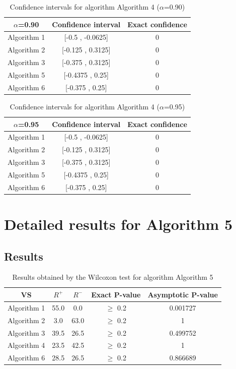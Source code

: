 \documentclass[a4paper,10pt]{article}
\begin{document}
\begin{table}[!htp]
\centering\small
\begin{tabular}{
|c|c|c|}
\hline
 $\alpha$=0.90 & Confidence interval & Exact confidence \\ \hline 
Algorithm 1 & [-0.5 , -0.0625] & 0\\ \hline 
Algorithm 2 & [-0.125 , 0.3125] & 0\\ \hline 
Algorithm 3 & [-0.375 , 0.3125] & 0\\ \hline 
Algorithm 5 & [-0.4375 , 0.25] & 0\\ \hline 
Algorithm 6 & [-0.375 , 0.25] & 0\\ \hline 

\end{tabular}
\caption{Confidence intervals for algorithm Algorithm 4 ($\alpha$=0.90)}
\end{table}
\begin{table}[!htp]
\centering\small
\begin{tabular}{
|c|c|c|}
\hline
 $\alpha$=0.95 & Confidence interval & Exact confidence \\ \hline 
Algorithm 1 & [-0.5 , -0.0625] & 0\\ \hline 
Algorithm 2 & [-0.125 , 0.3125] & 0\\ \hline 
Algorithm 3 & [-0.375 , 0.3125] & 0\\ \hline 
Algorithm 5 & [-0.4375 , 0.25] & 0\\ \hline 
Algorithm 6 & [-0.375 , 0.25] & 0\\ \hline 

\end{tabular}
\caption{Confidence intervals for algorithm Algorithm 4 ($\alpha$=0.95)}
\end{table}

 \clearpage 


\section{Detailed results for Algorithm 5}


\subsection{Results}

\begin{table}[!htp]
\centering\small
\begin{tabular}{
|c|c|c|c|c|}
\hline
 VS & $R^{+}$ & $R^{-}$ & Exact P-value & Asymptotic P-value \\ \hline 
Algorithm 1 & 55.0 & 0.0 & $\geq$ 0.2 & 0.001727\\ \hline 
Algorithm 2 & 3.0 & 63.0 & $\geq$ 0.2 & 1\\ \hline 
Algorithm 3 & 39.5 & 26.5 & $\geq$ 0.2 & 0.499752\\ \hline 
Algorithm 4 & 23.5 & 42.5 & $\geq$ 0.2 & 1\\ \hline 
Algorithm 6 & 28.5 & 26.5 & $\geq$ 0.2 & 0.866689\\ \hline 

\end{tabular}
\caption{Results obtained by the Wilcoxon test for algorithm Algorithm 5}
\end{table}
\end{document}
